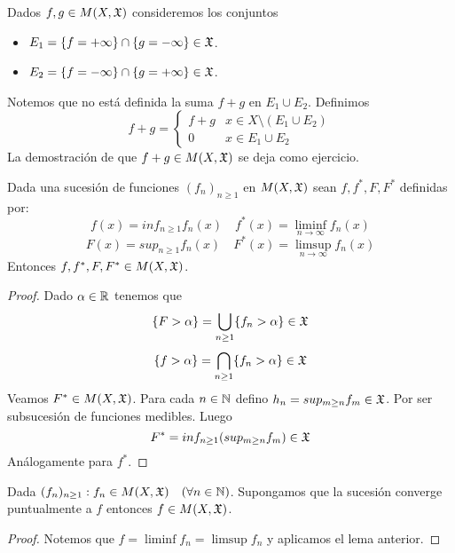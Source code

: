 \clearpage

\begin{note}
    Dados $f, g \in M(X, \mathfrak{X})$ consideremos los conjuntos \begin{itemize}
        \item $E_1 = \{ f = + \infty \} \cap \{ g = - \infty \} \in \mathfrak{X}$.
        \item $E_2 = \{ f = - \infty \} \cap \{ g = + \infty \} \in \mathfrak{X}$.
    \end{itemize}
    Notemos que no está definida la suma $f + g$ en $E_1 \cup E_2$.
    Definimos \begin{equation*}
        f+g = \begin{cases}
            f+g & x \in X \setminus (E_1 \cup E_2) \\
            0   & x \in E_1 \cup E_2
        \end{cases}
    \end{equation*}
    La demostración de que $f+g \in M(X, \mathfrak{X})$ se deja como ejercicio.
\end{note}

\begin{lemma}
    Dada una sucesión de funciones $(f_n)_{n \geq 1}$ en $M(X, \mathfrak{X})$ sean $f, f^*, F, F^*$ definidas por:
    \begin{equation*}
        f(x) = inf_{n \geq 1} f_n(x) \quad f^*(x) = \liminf_{n \to \infty} f_n(x)
    \end{equation*}
    \begin{equation*}
        F(x) = sup_{n \geq 1} f_n(x) \quad F^*(x) = \limsup_{n \to \infty} f_n(x)
    \end{equation*}
    Entonces $f, f^*, F, F^* \in M(X, \mathfrak{X})$.
    \begin{proof}
        Dado $\alpha \in \mathbb{R}$ tenemos que \begin{equation*}
            \{ F > \alpha \} = \bigcup_{n \geq 1} \{ f_n > \alpha \} \in \mathfrak{X}
        \end{equation*}
        \begin{equation*}
            \{ f > \alpha \} = \bigcap_{n \geq 1} \{ f_n > \alpha \} \in \mathfrak{X}
        \end{equation*}
        Veamos $F^* \in M(X, \mathfrak{X})$. Para cada $n \in \mathbb{N}$ defino $h_n = sup_{m \geq n} f_m \in \mathfrak{X}$. Por ser subsucesión de funciones medibles.
        Luego \begin{equation*}
            F^* = inf_{n \geq 1} (sup_{m \geq n} f_m) \in \mathfrak{X}
        \end{equation*}
        Análogamente para $f^*$.
    \end{proof}
\end{lemma}

\begin{corollary}
    Dada $(f_n)_{n \geq 1} : f_n \in M(X, \mathfrak{X}) \quad (\forall n \in \mathbb{N})$. Supongamos que la sucesión converge puntualmente a $f$ entonces $f \in M(X, \mathfrak{X})$.
    \begin{proof}
        Notemos que $f = \liminf f_n = \limsup f_n$ y aplicamos el lema anterior.
    \end{proof}
\end{corollary}